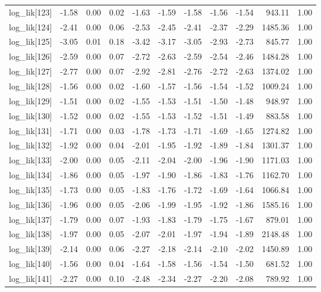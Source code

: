 \begin{table}[ht]
\begin{tabular}{rrrrrrrrrrr}
  log\_lik[123] & -1.58 & 0.00 & 0.02 & -1.63 & -1.59 & -1.58 & -1.56 & -1.54 & 943.11 & 1.00 \\ 
  log\_lik[124] & -2.41 & 0.00 & 0.06 & -2.53 & -2.45 & -2.41 & -2.37 & -2.29 & 1485.36 & 1.00 \\ 
  log\_lik[125] & -3.05 & 0.01 & 0.18 & -3.42 & -3.17 & -3.05 & -2.93 & -2.73 & 845.77 & 1.00 \\ 
  log\_lik[126] & -2.59 & 0.00 & 0.07 & -2.72 & -2.63 & -2.59 & -2.54 & -2.46 & 1484.28 & 1.00 \\ 
  log\_lik[127] & -2.77 & 0.00 & 0.07 & -2.92 & -2.81 & -2.76 & -2.72 & -2.63 & 1374.02 & 1.00 \\ 
  log\_lik[128] & -1.56 & 0.00 & 0.02 & -1.60 & -1.57 & -1.56 & -1.54 & -1.52 & 1009.24 & 1.00 \\ 
  log\_lik[129] & -1.51 & 0.00 & 0.02 & -1.55 & -1.53 & -1.51 & -1.50 & -1.48 & 948.97 & 1.00 \\ 
  log\_lik[130] & -1.52 & 0.00 & 0.02 & -1.55 & -1.53 & -1.52 & -1.51 & -1.49 & 883.58 & 1.00 \\ 
  log\_lik[131] & -1.71 & 0.00 & 0.03 & -1.78 & -1.73 & -1.71 & -1.69 & -1.65 & 1274.82 & 1.00 \\ 
  log\_lik[132] & -1.92 & 0.00 & 0.04 & -2.01 & -1.95 & -1.92 & -1.89 & -1.84 & 1301.37 & 1.00 \\ 
  log\_lik[133] & -2.00 & 0.00 & 0.05 & -2.11 & -2.04 & -2.00 & -1.96 & -1.90 & 1171.03 & 1.00 \\ 
  log\_lik[134] & -1.86 & 0.00 & 0.05 & -1.97 & -1.90 & -1.86 & -1.83 & -1.76 & 1162.70 & 1.00 \\ 
  log\_lik[135] & -1.73 & 0.00 & 0.05 & -1.83 & -1.76 & -1.72 & -1.69 & -1.64 & 1066.84 & 1.00 \\ 
  log\_lik[136] & -1.96 & 0.00 & 0.05 & -2.06 & -1.99 & -1.95 & -1.92 & -1.86 & 1585.16 & 1.00 \\ 
  log\_lik[137] & -1.79 & 0.00 & 0.07 & -1.93 & -1.83 & -1.79 & -1.75 & -1.67 & 879.01 & 1.00 \\ 
  log\_lik[138] & -1.97 & 0.00 & 0.05 & -2.07 & -2.01 & -1.97 & -1.94 & -1.89 & 2148.48 & 1.00 \\ 
  log\_lik[139] & -2.14 & 0.00 & 0.06 & -2.27 & -2.18 & -2.14 & -2.10 & -2.02 & 1450.89 & 1.00 \\ 
  log\_lik[140] & -1.56 & 0.00 & 0.04 & -1.64 & -1.58 & -1.56 & -1.54 & -1.50 & 681.52 & 1.00 \\ 
  log\_lik[141] & -2.27 & 0.00 & 0.10 & -2.48 & -2.34 & -2.27 & -2.20 & -2.08 & 789.92 & 1.00 \\ 

\end{tabular}
\end{table}
